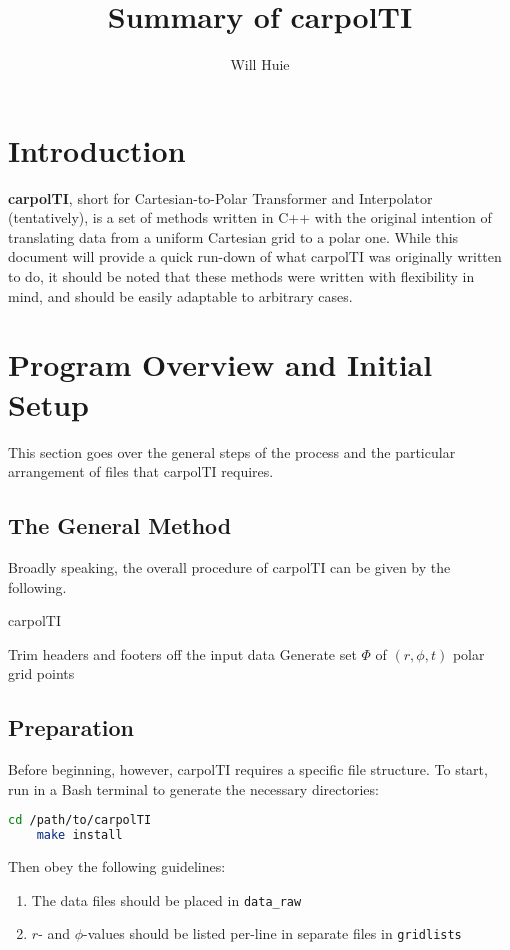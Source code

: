 \documentclass[hidelinks,12pt]{article}
\title{Summary of carpolTI}
\date{}
\author{Will Huie}
\begin{document}
\maketitle
\onehalfspacing

\section{Introduction}
\textbf{carpolTI}, short for Cartesian-to-Polar Transformer and Interpolator (tentatively), is a set of methods written in C++ with the original intention of translating data from a uniform Cartesian grid to a polar one. While this document will provide a quick run-down of what carpolTI was originally written to do, it should be noted that these methods were written with flexibility in mind, and should be easily adaptable to arbitrary cases.

\section{Program Overview and Initial Setup}
This section goes over the general steps of the process and the particular arrangement of files that carpolTI requires.

\subsection{The General Method}
Broadly speaking, the overall procedure of carpolTI can be given by the following.
\begin{algorithm}
    \caption{carpolTI}
    \nl Trim headers and footers off the input data\;
    \nl Generate set $\Phi$ of $(r, \phi, t)$ polar grid points\;
    \nl {}
\end{algorithm}

\subsection{Preparation}
Before beginning, however, carpolTI requires a specific file structure. To start, run in a Bash terminal to generate the necessary directories:
\begin{lstlisting}[language=bash]
    cd /path/to/carpolTI
    make install
\end{lstlisting}
Then obey the following guidelines:
\begin{enumerate}[label={$\cdot$},leftmargin={1cm},rightmargin={1cm}]
    \item The data files should be placed in \texttt{data\_raw}
    \item $r$- and $\phi$-values should be listed per-line in separate files in \texttt{gridlists}
\end{enumerate}
\end{document}
